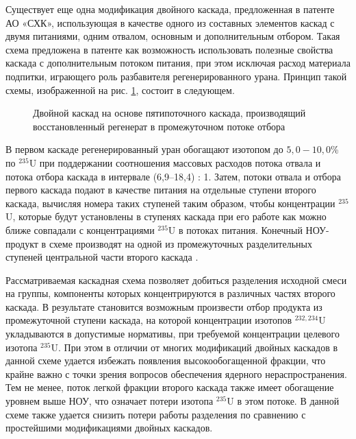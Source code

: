 Существует еще одна модификация двойного каскада, предложенная в патенте АО «СХК», использующая в качестве одного из составных элементов каскад с двумя питаниями, одним отвалом, основным и дополнительным отбором. Такая схема предложена в патенте \cite{SposobIzotopnogoVosstanovleniyac} как возможность использовать полезные свойства каскада с дополнительным потоком питания, при этом исключая расход материала подпитки, играющего роль разбавителя регенерированного урана. Принцип такой схемы, изображенной на рис. \ref{fig:double_crazy}, состоит в следующем.

\begin{figure}[ht]
  \caption{Двойной каскад на основе пятипоточного каскада, производящий восстановленный регенерат в промежуточном потоке отбора}\label{fig:double_crazy}
\end{figure}

В первом каскаде регенерированный уран обогащают изотопом до $5,0-10,0$\% по $^{235}$U при поддержании соотношения массовых расходов потока отвала и потока отбора каскада в интервале (6,9–18,4) : 1. Затем, потоки отвала и отбора первого каскада подают в качестве питания на отдельные ступени второго каскада, вычисляя номера таких ступеней таким образом, чтобы концентрации $^{235}$U, которые будут установлены в ступенях каскада при его работе как можно ближе совпадали с концентрациями $^{235}$U в потоках питания. Конечный НОУ-продукт в схеме производят на одной из промежуточных разделительных ступеней центральной части второго каскада \cite{SposobIzotopnogoVosstanovleniyac}.

Рассматриваемая каскадная схема позволяет добиться разделения исходной смеси на группы, компоненты которых концентрируются в различных частях второго каскада. В результате становится возможным произвести отбор продукта из промежуточной ступени каскада, на которой концентрации изотопов $^{232,234}$U укладываются в допустимые нормативы, при требуемой концентрации целевого изотопа $^{235}$U. При этом в отличии от многих модификаций двойных каскадов в данной схеме удается избежать появления высокообогащенной фракции, что крайне важно с точки зрения вопросов обеспечения ядерного нераспространения. Тем не менее, поток легкой фракции второго каскада также имеет обогащение уровнем выше НОУ, что означает потери изотопа $^{235}$U в этом потоке. В данной схеме также удается снизить потери работы разделения по сравнению с простейшими модификациями двойных каскадов. 


